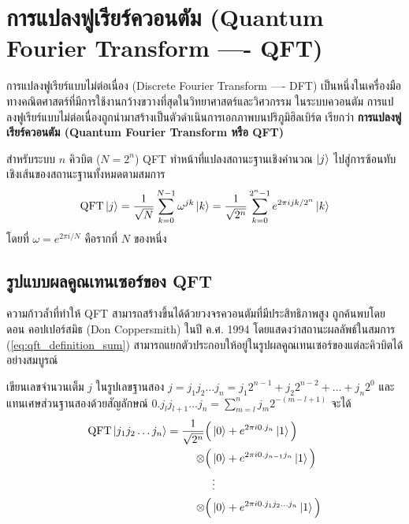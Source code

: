 \section{การแปลงฟูเรียร์ควอนตัม (Quantum Fourier Transform ---- QFT)}

การแปลงฟูเรียร์แบบไม่ต่อเนื่อง (Discrete Fourier Transform ---- DFT) เป็นหนึ่งในเครื่องมือทางคณิตศาสตร์ที่มีการใช้งานกว้างขวางที่สุดในวิทยาศาสตร์และวิศวกรรม ในระบบควอนตัม การแปลงฟูเรียร์แบบไม่ต่อเนื่องถูกนำมาสร้างเป็นตัวดำเนินการเอกภาพบนปริภูมิฮิลเบิร์ต เรียกว่า \textbf{การแปลงฟูเรียร์ควอนตัม (Quantum Fourier Transform หรือ QFT)}

สำหรับระบบ $n$ คิวบิต ($N = 2^n$) QFT ทำหน้าที่แปลงสถานะฐานเชิงคำนวณ $\ket{j}$ ไปสู่การซ้อนทับเชิงเส้นของสถานะฐานทั้งหมดตามสมการ
\begin{equation}
\text{QFT} \ket{j} = \frac{1}{\sqrt{N}} \sum_{k=0}^{N-1} \omega^{j k} \ket{k} = \frac{1}{\sqrt{2^n}} \sum_{k=0}^{2^n-1} e^{2\pi i j k / 2^n} \ket{k}
\label{eq:qft_definition_sum}
\end{equation}
โดยที่ $\omega = e^{2\pi i / N}$ คือรากที่ $N$ ของหนึ่ง

\subsection{รูปแบบผลคูณเทนเซอร์ของ QFT}
ความก้าวล้ำที่ทำให้ QFT สามารถสร้างขึ้นได้ด้วยวงจรควอนตัมที่มีประสิทธิภาพสูง ถูกค้นพบโดย ดอน คอปเปอร์สมิธ (Don Coppersmith) ในปี ค.ศ. 1994 โดยแสดงว่าสถานะผลลัพธ์ในสมการ (\ref{eq:qft_definition_sum}) สามารถแยกตัวประกอบให้อยู่ในรูปผลคูณเทนเซอร์ของแต่ละคิวบิตได้อย่างสมบูรณ์

เขียนเลขจำนวนเต็ม $j$ ในรูปเลขฐานสอง $j = j_1 j_2 \dots j_n = j_1 2^{n-1} + j_2 2^{n-2} + \dots + j_n 2^0$ และแทนเศษส่วนฐานสองด้วยสัญลักษณ์ $0.j_l j_{l+1} \dots j_n = \sum_{m=l}^n j_m 2^{-(m-l+1)}$ จะได้
\begin{align}
\text{QFT} \ket{j_1 j_2 \dots j_n} = \frac{1}{\sqrt{2^n}} &\Big( \ket{0} + e^{2\pi i 0.j_n}\ket{1} \Big) \nonumber \\
\otimes &\Big( \ket{0} + e^{2\pi i 0.j_{n-1}j_n}\ket{1} \Big) \nonumber \\
&\ \ \vdots \nonumber \\
\otimes &\Big( \ket{0} + e^{2\pi i 0.j_1 j_2 \dots j_n}\ket{1} \Big)
\label{eq:qft_product_representation}
\end{align}

